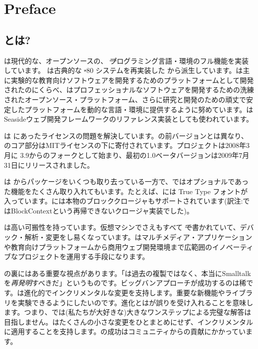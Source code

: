 \documentclass[a4paper,10pt,twoside]{book}
\begin{document}
	\sloppy
	\frontmatter
\fi
\chapter{Preface}

\section*{\pharo とは?}

\pharo は現代的な、オープンソースの、 \st プログラミング言語・環境のフル機能を実装しています。 \pharo は古典的な \st-80 システムを再実装した \squeak\cite{Inga97a}から派生しています。\squeak は主に実験的な教育向けソフトウェアを開発するためのプラットフォームとして開発されたのにくらべ、\pharo はプロフェッショナルなソフトウェアを開発するための洗練されたオープンソース・プラットフォーム、さらに研究と開発のための頑丈で安定したプラットフォームを動的な言語・環境に提供するように努めています。\pharo はSeasideウェブ開発フレームワークのリファレンス実装としても使われています。

\pharo は \squeak にあったライセンスの問題を解決しています。\squeak の前バージョンとは異なり、\pharo のコア部分はMITライセンスの下に寄付されています。\pharo プロジェクトは2008年3月に \squeak 3.9からのフォークとして始まり、最初の1.0ベータバージョンは2009年7月31日にリリースされました。

\pharo は \squeak からパッケージをいくつも取り去っている一方で、\squeak ではオプショナルであった機能をたくさん取り入れてもいます。たとえば、\pharo には True Type フォントが入っています。\pharo には本物のブロッククロージャもサポートされています(訳注:\squeak ではBlockContextという再帰できないクロージャ実装でした)。

\pharo は高い可搬性を持っています。仮想マシンでさえもすべて \st で書かれていて、デバック・解析・変更をし易くなっています。\pharo はマルチメディア・アプリケーションや教育向けプラットフォームから商用ウェブ開発環境まで広範囲のイノベーティブなプロジェクトを運用する手段になります。


\pharo の裏にはある重要な視点があります。「\pharo は過去の複製ではなく、本当にSmalltalkを\emph{再発明}すべきだ」というものです。ビッグバンアプローチが成功するのは稀です。\pharo は進化的でインクリメンタルな変更を支持します。重要な新機能やライブラリを実験できるようにしたいのです。進化とは\pharo が誤りを受け入れることを意味します。つまり、\pharo では(私たちが大好きな)大きなワンステップによる完璧な解答は目指しません。\pharo はたくさんの小さな変更をひとまとめにせず、インクリメンタルに適用することを支持します。\pharo の成功はコミュニティからの貢献にかかっています。
\end{document}
